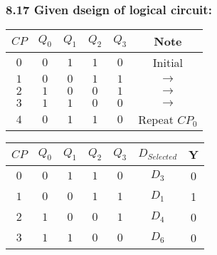     \subsubsection{8.17 \textnormal{ Given dseign of logical circuit: }}
    {\color{hwSolution}

    \begin{center}\begin{tabular}{|c|cccc|c|}
        \hline
        $ CP $ & $Q_0$ & $Q_1$ & $Q_2$ & $Q_3$ & Note
        \\
        \hline
        $ 0 $ & $0$ & $1$ & $1$ & $0$ & Initial \\
        $ 1 $ & $0$ & $0$ & $1$ & $1$ & $\rightarrow$ \\
        $ 2 $ & $1$ & $0$ & $0$ & $1$ & $\rightarrow$\\
        $ 3 $ & $1$ & $1$ & $0$ & $0$ & $\rightarrow$\\
        $ 4 $ & $0$ & $1$ & $1$ & $0$ & Repeat $CP_0$\\
        \hline
    \end{tabular}\end{center}

    }

    {\color{hwSolution}

    \begin{center}\begin{tabular}{|c|cccc|c|c|}
        \hline
        $ CP $ & $Q_0$ & $Q_1$ & $Q_2$ & $Q_3$ & $D_{Selected}$ & Y
        \\
        \hline
        $ 0 $ & $0$ & $1$ & $1$ & $0$ & $D_{3}$ & 0 \\
        $ 1 $ & $0$ & $0$ & $1$ & $1$ & $D_{1}$ & 1 \\
        $ 2 $ & $1$ & $0$ & $0$ & $1$ & $D_{4}$ & 0 \\
        $ 3 $ & $1$ & $1$ & $0$ & $0$ & $D_{6}$ & 0 \\
        \hline
    \end{tabular}\end{center}

    }